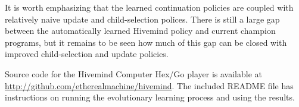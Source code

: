 \documentclass{acm_proc_article-sp}
\begin{document}
It is worth emphasizing 
that  the learned continuation policies are coupled with relatively naive update and child-selection
polices.  
There is still a large gap between the automatically learned Hivemind policy and current champion programs,
but it remains to be seen how much of this gap can be closed with improved child-selection and update policies.

Source code for the Hivemind Computer Hex/Go player is available at \url{http://github.com/etherealmachine/hivemind}. The included README file has instructions on running the evolutionary learning process and using the results.



\end{document}
